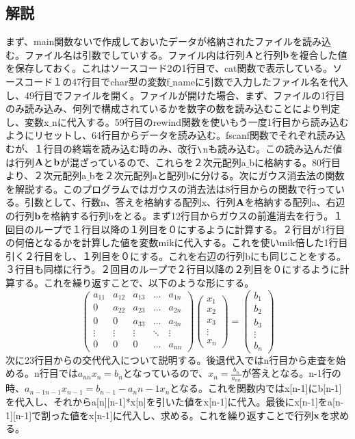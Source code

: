 \documentclass{jsarticle}
\begin{document}
\subsection{解説}
まず、main関数ないで作成しておいたデータが格納されたファイルを読み込む。ファイル名は引数でしていする。ファイル内は行列$\bf{A}$と行列$\bf{b}$を複合した値を保存しておく。これはソースコード2の1行目で、cat関数で表示している。ソースコード１の47行目でchar型の変数f$\_$nameに引数で入力したファイル名を代入し、49行目でファイルを開く。ファイルが開けた場合、まず、ファイルの1行目のみ読み込み、何列で構成されているかを数字の数を読み込むことにより判定し、変数x$\_$nに代入する。59行目のrewind関数を使いもう一度1行目から読み込むようにリセットし、64行目からデータを読み込む。fscanf関数でそれぞれ読み込むが、１行目の終端を読み込む時のみ、改行$\verb|\|$nも読み込む。この読み込んだ値は行列$\bf{A}$と$\bf{b}$が混ざっているので、これらを２次元配列a$\_$bに格納する。80行目より、２次元配列a$\_$bを２次元配列aと配列bに分ける。次にガウス消去法の関数を解説する。このプログラムではガウスの消去法は8行目からの関数で行っている。引数として、行数n、答えを格納する配列x、行列${\bf{A}}$を格納する配列a、右辺の行列$\bf{b}$を格納する行列bをとる。まず12行目からガウスの前進消去を行う。１回目のループで１行目以降の１列目を０にするように計算する。２行目が1行目の何倍となるかを計算した値を変数mikに代入する。これを使いmik倍した1行目引く２行目をし、１列目を０にする。これを右辺の行列bにも同じことをする。３行目も同様に行う。２回目のループで２行目以降の２列目を０にするように計算する。これを繰り返すことで、以下のような形にする。
\[
  \left(
    \begin{array}{ccccc}
      a_{11} & a_{12} & a_{13} & \ldots & a_{1n} \\
      0 & a_{22} & a_{23} &\ldots & a_{2n} \\
      0  & 0 & a_{33} & \ldots & a_{3n} \\
      \vdots & \vdots & \vdots & \ddots & \vdots \\
      0 & 0 & 0 & \ldots & a_{nn}
    \end{array}
  \right)
  \left(
   \begin{array}{c}
   x_1 \\
   x_2 \\
   x_3 \\
   \vdots \\
   x_n
   \end{array}
  \right)=
  \left(
   \begin{array}{c}
   b_1 \\
   b_2 \\
   b_3 \\
   \vdots \\
   b_n
   \end{array}
  \right)
\]
次に23行目からの交代代入について説明する。後退代入ではn行目から走査を始める。n行目では$a_{nn}x_n=b_n$となっているので、$x_n=\frac{b_n}{a_{nn}}$が答えとなる。n-1行の時、$a_{n-1 n-1}x_{n-1}=b_{n-1}-a_nn-1x_n$となる。これを関数内ではx[n-1]にb[n-1]を代入し、それからa[n][n-1]*x[n]を引いた値をx[n-1]に代入。最後にx[n-1]をa[n-1][n-1]で割った値をx[n-1]に代入し、求める。これを繰り返すことで行列$\bf{x}$を求める。
\end{document}
